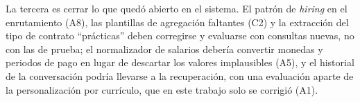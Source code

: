 La tercera es cerrar lo que quedó abierto en el sistema. El patrón de \textit{hiring} en el enrutamiento (A8), las plantillas de agregación faltantes (C2) y la extracción del tipo de contrato \enquote{prácticas} deben corregirse y evaluarse con consultas nuevas, no con las de prueba; el normalizador de salarios debería convertir monedas y periodos de pago en lugar de descartar los valores implausibles (A5), y el historial de la conversación podría llevarse a la recuperación, con una evaluación aparte de la personalización por currículo, que en este trabajo solo se corrigió (A1).
